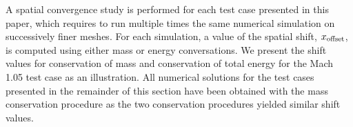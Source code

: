 \documentclass[times,doublespace]{fldauth}%
\begin{document}
A spatial convergence study is performed for each test case presented in this paper, which requires to run multiple times the same numerical simulation on successively finer meshes. For each simulation, a value of the spatial shift, $x_{\text{\text{offset}}}$, is computed using either mass or energy conversations. We present the shift values for conservation of mass and conservation of total energy for the Mach 1.05 test case as an illustration. All numerical solutions for the test cases presented in the remainder of this section have been obtained with the mass conservation procedure as the two conservation procedures yielded similar shift values.
%
\end{document}

